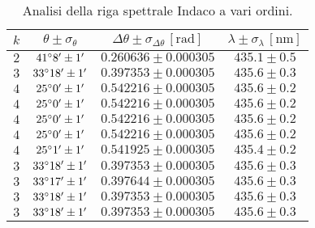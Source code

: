 \documentclass[]{article}
\begin{document}
    \begin{table}[H]
        \centering
        \begin{tabular}{||c|c|c|c||}
            \hline
            $k$ & $\theta \pm \sigma_{\theta}$ & $\Delta\theta \pm \sigma_{\Delta\theta} \, \left[\text{rad}\right]$ & $\lambda \pm \sigma_{\lambda} \, \left[\text{nm}\right]$ \\\hline
            \hline
            $2$ & $41\degree  8' \pm 1'$ & $0.260636 \pm 0.000305$ & $435.1 \pm 0.5$ \\\hline
            $3$ & $33\degree 18' \pm 1'$ & $0.397353 \pm 0.000305$ & $435.6 \pm 0.3$ \\\hline
            $4$ & $25\degree  0' \pm 1'$ & $0.542216 \pm 0.000305$ & $435.6 \pm 0.2$ \\\hline
            $4$ & $25\degree  0' \pm 1'$ & $0.542216 \pm 0.000305$ & $435.6 \pm 0.2$ \\\hline
            $4$ & $25\degree  0' \pm 1'$ & $0.542216 \pm 0.000305$ & $435.6 \pm 0.2$ \\\hline
            $4$ & $25\degree  0' \pm 1'$ & $0.542216 \pm 0.000305$ & $435.6 \pm 0.2$ \\\hline
            $4$ & $25\degree  1' \pm 1'$ & $0.541925 \pm 0.000305$ & $435.4 \pm 0.2$ \\\hline
            $3$ & $33\degree 18' \pm 1'$ & $0.397353 \pm 0.000305$ & $435.6 \pm 0.3$ \\\hline
            $3$ & $33\degree 17' \pm 1'$ & $0.397644 \pm 0.000305$ & $435.6 \pm 0.3$ \\\hline
            $3$ & $33\degree 18' \pm 1'$ & $0.397353 \pm 0.000305$ & $435.6 \pm 0.3$ \\\hline
            $3$ & $33\degree 18' \pm 1'$ & $0.397353 \pm 0.000305$ & $435.6 \pm 0.3$ \\\hline
        \end{tabular}
        \caption{Analisi della riga spettrale Indaco a vari ordini.}
        \label{indaco}
    \end{table}
    
\end{document}
